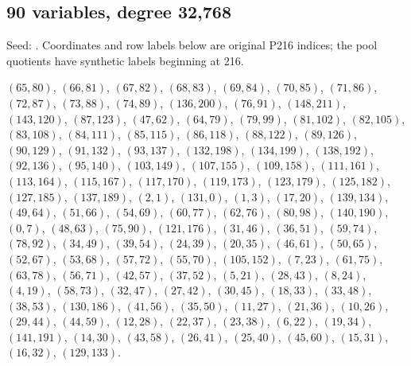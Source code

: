 \documentclass[11pt]{article}
\theoremstyle{definition}\newtheorem{definition}[theorem]{Definition}
\newcommand{\code}[1]{\texttt{\detokenize{#1}}}
\begin{document}
\subsection*{90 variables, degree 32,768}
Seed: \code{source206_joint.json}. Coordinates and row labels below are original P216 indices; the pool quotients have synthetic labels beginning at 216.
{\small\raggedright
$(65,80)$, $(66,81)$, $(67,82)$, $(68,83)$, $(69,84)$, $(70,85)$, $(71,86)$, $(72,87)$, $(73,88)$, $(74,89)$, $(136,200)$, $(76,91)$, $(148,211)$, $(143,120)$, $(87,123)$, $(47,62)$, $(64,79)$, $(79,99)$, $(81,102)$, $(82,105)$, $(83,108)$, $(84,111)$, $(85,115)$, $(86,118)$, $(88,122)$, $(89,126)$, $(90,129)$, $(91,132)$, $(93,137)$, $(132,198)$, $(134,199)$, $(138,192)$, $(92,136)$, $(95,140)$, $(103,149)$, $(107,155)$, $(109,158)$, $(111,161)$, $(113,164)$, $(115,167)$, $(117,170)$, $(119,173)$, $(123,179)$, $(125,182)$, $(127,185)$, $(137,189)$, $(2,1)$, $(131,0)$, $(1,3)$, $(17,20)$, $(139,134)$, $(49,64)$, $(51,66)$, $(54,69)$, $(60,77)$, $(62,76)$, $(80,98)$, $(140,190)$, $(0,7)$, $(48,63)$, $(75,90)$, $(121,176)$, $(31,46)$, $(36,51)$, $(59,74)$, $(78,92)$, $(34,49)$, $(39,54)$, $(24,39)$, $(20,35)$, $(46,61)$, $(50,65)$, $(52,67)$, $(53,68)$, $(57,72)$, $(55,70)$, $(105,152)$, $(7,23)$, $(61,75)$, $(63,78)$, $(56,71)$, $(42,57)$, $(37,52)$, $(5,21)$, $(28,43)$, $(8,24)$, $(4,19)$, $(58,73)$, $(32,47)$, $(27,42)$, $(30,45)$, $(18,33)$, $(33,48)$, $(38,53)$, $(130,186)$, $(41,56)$, $(35,50)$, $(11,27)$, $(21,36)$, $(10,26)$, $(29,44)$, $(44,59)$, $(12,28)$, $(22,37)$, $(23,38)$, $(6,22)$, $(19,34)$, $(141,191)$, $(14,30)$, $(43,58)$, $(26,41)$, $(25,40)$, $(45,60)$, $(15,31)$, $(16,32)$, $(129,133)$.\par}
\end{document}
